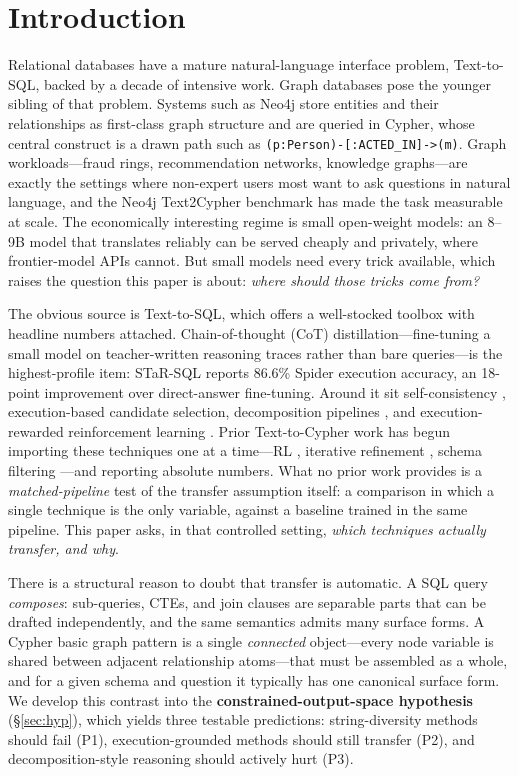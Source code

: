 \documentclass[11pt]{article}
\begin{document}
\section{Introduction}
Relational databases have a mature natural-language interface problem, Text-to-SQL, backed by a
decade of intensive work. Graph databases pose the younger sibling of that problem. Systems such as
Neo4j store entities and their relationships as first-class graph structure and are queried in
Cypher, whose central construct is a drawn path such as \texttt{(p:Person)-[:ACTED\_IN]->(m)}.
Graph workloads---fraud rings, recommendation networks, knowledge graphs---are exactly the settings
where non-expert users most want to ask questions in natural language, and the Neo4j
Text2\-Cypher benchmark \citep{ozsoy2025text2cypher} has made the task measurable at scale. The economically
interesting regime is small open-weight models: an 8--9B model that translates reliably can be
served cheaply and privately, where frontier-model APIs cannot. But small models need every trick
available, which raises the question this paper is about: \emph{where should those tricks come
from?}

The obvious source is Text-to-SQL, which offers a well-stocked toolbox with headline numbers
attached. Chain-of-thought (CoT) distillation---fine-tuning a small model on teacher-written
reasoning traces rather than bare queries---is the highest-profile item: STaR-SQL
\citep{he2025starsql} reports 86.6\% Spider execution accuracy, an 18-point improvement over
direct-answer fine-tuning. Around it sit self-consistency \citep{wang2022selfconsistency},
execution-based candidate selection, decomposition pipelines \citep{tai2023cot, pourreza2023dinsql},
and execution-rewarded reinforcement learning \citep{shao2024deepseekmath, yao2025arctic}. Prior
Text-to-Cypher work has begun importing these techniques one at a time---RL
\citep{tran2025refining}, iterative refinement \citep{ozsoy2025iterative}, schema filtering
\citep{ozsoy2025schema}---and reporting absolute numbers. What no prior work provides is a
\emph{matched-pipeline} test of the transfer assumption itself: a comparison in which a single
technique is the only variable, against a baseline trained in the same pipeline. This paper asks,
in that controlled setting, \emph{which techniques actually transfer, and why}.

There is a structural reason to doubt that transfer is automatic. A SQL query \emph{composes}:
sub-queries, CTEs, and join clauses are separable parts that can be drafted independently, and the
same semantics admits many surface forms. A Cypher basic graph pattern is a single \emph{connected}
object---every node variable is shared between adjacent relationship atoms---that must be assembled
as a whole, and for a given schema and question it typically has one canonical surface form. We
develop this contrast into the \textbf{constrained-output-space hypothesis} (\S\ref{sec:hyp}),
which yields three testable predictions: string-diversity methods should fail (P1),
execution-grounded methods should still transfer (P2), and decomposition-style reasoning should
actively hurt (P3).
\end{document}
